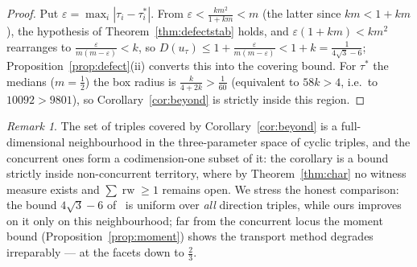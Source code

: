 \documentclass{aims}
\numberwithin{equation}{section}
\theoremstyle{plain}
\theoremstyle{definition}
\theoremstyle{remark}
\newtheorem{remark}[theorem]{Remark}
\newcommand{\rw}{\operatorname{rw}}
\begin{document}
\begin{proof}
Put $\varepsilon=\max_i|\tau_i-\tau_i^*|$. From
$\varepsilon<\frac{km^2}{1+km}<m$ (the latter since $km<1+km$), the
hypothesis of Theorem~\ref{thm:defectstab} holds, and
$\varepsilon(1+km)<km^2$ rearranges to
$\frac\varepsilon{m(m-\varepsilon)}<k$, so
$D(u_\tau)\le1+\frac\varepsilon{m(m-\varepsilon)}<1+k=\tfrac1{4\sqrt3-6}$;
Proposition~\ref{prop:defect}(ii) converts this into the covering bound. For
$\tau^*$ the medians ($m=\tfrac12$) the box radius is
$\frac{k}{4+2k}>\tfrac1{60}$ (equivalent to $58k>4$, i.e.\ to
$10092>9801$), so Corollary~\ref{cor:beyond} is strictly inside this region.
\end{proof}

\begin{remark}\label{rem:beyond}
The set of triples covered by Corollary~\ref{cor:beyond} is a full-dimensional
neighbourhood in the three-parameter space of cyclic triples, and the concurrent
ones form a codimension-one subset of it: the corollary is a bound strictly
inside non-concurrent territory, where by Theorem~\ref{thm:char} no witness
measure exists and $\sum\rw\ge1$ remains open. We stress the honest comparison:
the bound $4\sqrt3-6$ of~\cite{BY26} is uniform over \emph{all} direction
triples, while ours improves on it only on this neighbourhood; far from the
concurrent locus the moment bound (Proposition~\ref{prop:moment}) shows the
transport method degrades irreparably --- at the facets down to $\tfrac23$.
\end{remark}
\end{document}
